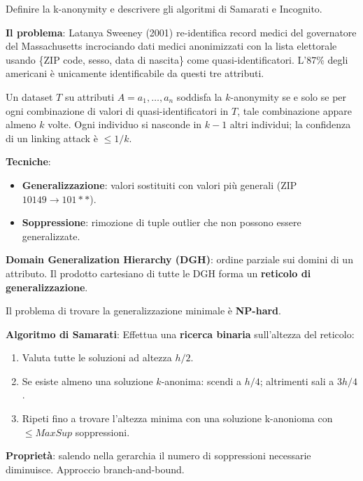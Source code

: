 \documentclass[a4paper,11pt]{article}
\begin{document}
\begin{domanda}
Definire la k-anonymity e descrivere gli algoritmi di Samarati e Incognito.
\end{domanda}

\textbf{Il problema}: Latanya Sweeney (2001) re-identifica record medici del governatore del Massachusetts incrociando dati medici anonimizzati con la lista elettorale usando \{ZIP code, sesso, data di nascita\} come quasi-identificatori. L'87\% degli americani \`{e} unicamente identificabile da questi tre attributi.

\begin{definizione}
Un dataset $T$ su attributi $A = a_1, \ldots, a_n$ soddisfa la $k$-anonymity se e solo se per ogni combinazione di valori di quasi-identificatori in $T$, tale combinazione appare almeno $k$ volte. Ogni individuo si nasconde in $k-1$ altri individui; la confidenza di un linking attack \`{e} $\leq 1/k$.
\end{definizione}

\textbf{Tecniche}:
\begin{itemize}
  \item \textbf{Generalizzazione}: valori sostituiti con valori pi\`{u} generali (ZIP $10149 \to 101**$).
  \item \textbf{Soppressione}: rimozione di tuple outlier che non possono essere generalizzate.
\end{itemize}

\textbf{Domain Generalization Hierarchy (DGH)}: ordine parziale sui domini di un attributo. Il prodotto cartesiano di tutte le DGH forma un \textbf{reticolo di generalizzazione}.

Il problema di trovare la generalizzazione minimale \`{e} \textbf{NP-hard}.

\textbf{Algoritmo di Samarati}:
Effettua una \textbf{ricerca binaria} sull'altezza del reticolo:
\begin{enumerate}
  \item Valuta tutte le soluzioni ad altezza $h/2$.
  \item Se esiste almeno una soluzione $k$-anonima: scendi a $h/4$; altrimenti sali a $3h/4$.
  \item Ripeti fino a trovare l'altezza minima con una soluzione k-anonioma con $\leq MaxSup$ soppressioni.
\end{enumerate}
\textbf{Propriet\`{a}}: salendo nella gerarchia il numero di soppressioni necessarie diminuisce. Approccio branch-and-bound.
\end{document}
